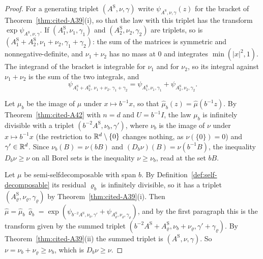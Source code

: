 \begin{proof}
\leanok
{}
For a generating triplet $(A^{\mathrm S}, \nu, \gamma)$ write $\psi_{A^{\mathrm S},\nu,\gamma}(z)$ for the bracket of
Theorem~\ref{thm:cited-A39}(i), so that the law with this triplet has the transform
$\exp\psi_{A^{\mathrm S},\nu,\gamma}$. If $(A^{\mathrm S}_1, \nu_1, \gamma_1)$ and
$(A^{\mathrm S}_2, \nu_2, \gamma_2)$ are triplets, so is
$(A^{\mathrm S}_1 + A^{\mathrm S}_2, \nu_1 + \nu_2, \gamma_1 + \gamma_2)$: the sum of the matrices is symmetric and
nonnegative-definite, and $\nu_1 + \nu_2$ has no mass at $0$ and integrates $\min(|x|^2, 1)$. The
integrand of the bracket is integrable for $\nu_1$ and for $\nu_2$, so its integral against
$\nu_1 + \nu_2$ is the sum of the two integrals, and
\[
  \psi_{A^{\mathrm S}_1 + A^{\mathrm S}_2,\,\nu_1 + \nu_2,\,\gamma_1 + \gamma_2}
  = \psi_{A^{\mathrm S}_1,\nu_1,\gamma_1} + \psi_{A^{\mathrm S}_2,\nu_2,\gamma_2}.
\]

Let $\mu_b$ be the image of $\mu$ under $x \mapsto b^{-1}x$, so that
$\widehat\mu_b(z) = \widehat\mu(b^{-1}z)$. By Theorem~\ref{thm:cited-A42} with $n = d$ and $U = b^{-1}I$,
the law $\mu_b$ is infinitely divisible with a triplet $(b^{-2}A^{\mathrm S}, \nu_b, \gamma')$, where $\nu_b$
is the image of $\nu$ under $x \mapsto b^{-1}x$ (the restriction to $\mathbb{R}^d \setminus \{0\}$ changes
nothing, as $\nu(\{0\}) = 0$) and $\gamma' \in \mathbb{R}^d$. Since $\nu_b(B) = \nu(bB)$ and
$(D_b\nu)(B) = \nu(b^{-1}B)$, the inequality $D_b\nu \ge \nu$ on all Borel sets is the inequality
$\nu \ge \nu_b$, read at the set $bB$.

Let $\mu$ be semi-selfdecomposable with span $b$. By Definition~\ref{def:self-decomposable} its
residual $\varrho_b$ is infinitely divisible, so it has a triplet
$(A^{\mathrm S}_\varrho, \nu_\varrho, \gamma_\varrho)$ by
Theorem~\ref{thm:cited-A39}(i). Then
$\widehat\mu = \widehat\mu_b\,\widehat\varrho_b = \exp(\psi_{b^{-2}A^{\mathrm S},\nu_b,\gamma'} +
\psi_{A^{\mathrm S}_\varrho,\nu_\varrho,\gamma_\varrho})$, and by the first paragraph this is the transform given by the
summed triplet $(b^{-2}A^{\mathrm S} + A^{\mathrm S}_\varrho, \nu_b + \nu_\varrho, \gamma' + \gamma_\varrho)$. By
Theorem~\ref{thm:cited-A39}(ii) the summed triplet is $(A^{\mathrm S}, \nu, \gamma)$. So
$\nu = \nu_b + \nu_\varrho \ge \nu_b$, which is $D_b\nu \ge \nu$.


\end{proof}
